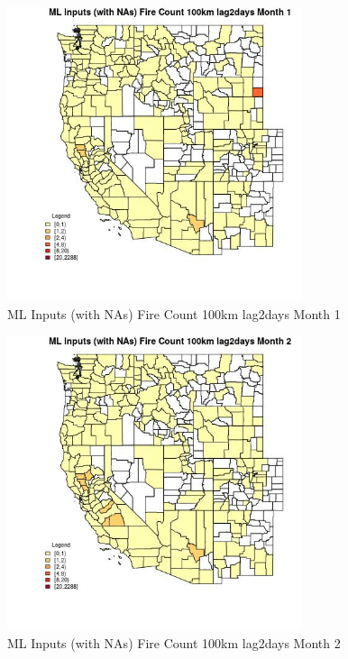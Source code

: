\clearpage 

\begin{figure} 
\centering  
\includegraphics[width=0.77\textwidth]{Code_Outputs/Report_ML_input_PM25_Step4_part_e_de_duplicated_aves_compiled_2019-05-20wNAs_CountyFire_Count_100km_lag2daysmedianMonth1.jpg} 
\caption{\label{fig:Report_ML_input_PM25_Step4_part_e_de_duplicated_aves_compiled_2019-05-20wNAsCountyFire_Count_100km_lag2daysmedianMonth1}ML Inputs (with NAs) Fire Count 100km lag2days Month 1} 
\end{figure} 
 

\begin{figure} 
\centering  
\includegraphics[width=0.77\textwidth]{Code_Outputs/Report_ML_input_PM25_Step4_part_e_de_duplicated_aves_compiled_2019-05-20wNAs_CountyFire_Count_100km_lag2daysmedianMonth2.jpg} 
\caption{\label{fig:Report_ML_input_PM25_Step4_part_e_de_duplicated_aves_compiled_2019-05-20wNAsCountyFire_Count_100km_lag2daysmedianMonth2}ML Inputs (with NAs) Fire Count 100km lag2days Month 2} 
\end{figure} 
 

